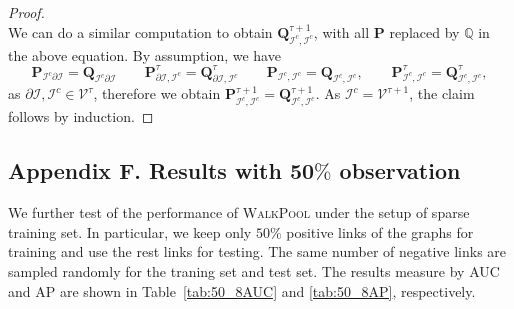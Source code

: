 \documentclass[11pt]{article}
\newcommand{\walkpool}{\textsc{WalkPool}\xspace}
\begin{document}
\begin{proof}
\begin{equation}
\end{equation}
We can do a similar computation to obtain $\mathbf{Q}^{\tau+1}_{\mathcal{I}^c,\mathcal{I}^c}$, with all $\mathbf{P}$ replaced by $\mathbb{Q}$ in the above equation. By assumption, we have
\begin{equation}
\mathbf{P}_{\mathcal{I}^c \mathcal{\partial I}}=\mathbf{Q}_{\mathcal{I}^c \mathcal{\partial I}} \qquad \mathbf{P}^{\tau}_{\partial\mathcal{I},\mathcal{I}^c}=\mathbf{Q}^{\tau}_{\partial\mathcal{I},\mathcal{I}^c}\qquad \mathbf{P}_{\mathcal{I}^c,\mathcal{I}^c}=\mathbf{Q}_{\mathcal{I}^c,\mathcal{I}^c},\qquad \mathbf{P}^{\tau}_{\mathcal{I}^c,\mathcal{I}^c}=\mathbf{Q}^{\tau}_{\mathcal{I}^c,\mathcal{I}^c},
\end{equation}
as $\partial\mathcal{I},\mathcal{I}^c\in \mathcal{V}^{\tau}$, therefore we obtain $\mathbf{P}^{\tau+1}_{\mathcal{I}^c,\mathcal{I}^c}=\mathbf{Q}^{\tau+1}_{\mathcal{I}^c,\mathcal{I}^c}$. As $\mathcal{I}^c = \mathcal{V}^{\tau+1}$, the claim follows by induction.
\end{proof}


\subsection*{Appendix F. Results with 50$\%$ observation}
We further test of the performance of \walkpool under the setup of sparse training set. In particular, we keep only $50\%$ positive links of the graphs for training and use the rest links for testing. The same number of negative links are sampled randomly for the traning set and test set. The results measure by AUC and AP are shown in Table~\ref{tab:50_8AUC} and \ref{tab:50_8AP}, respectively. 
\end{document}
